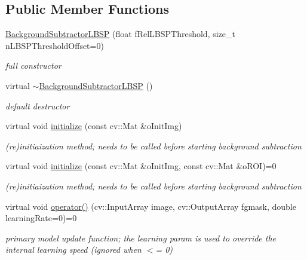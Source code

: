 \subsection*{Public Member Functions}
\begin{DoxyCompactItemize}
\item 
\mbox{\hyperlink{class_background_subtractor_l_b_s_p_a5f7f42ea5c9697479cbe237b49ca6ae9}{Background\+Subtractor\+L\+B\+SP}} (float f\+Rel\+L\+B\+S\+P\+Threshold, size\+\_\+t n\+L\+B\+S\+P\+Threshold\+Offset=0)
\begin{DoxyCompactList}\small\item\em full constructor \end{DoxyCompactList}\item 
virtual \mbox{\hyperlink{class_background_subtractor_l_b_s_p_a027bdf387b28e5532d78b5bf4e7c08eb}{$\sim$\+Background\+Subtractor\+L\+B\+SP}} ()
\begin{DoxyCompactList}\small\item\em default destructor \end{DoxyCompactList}\item 
virtual void \mbox{\hyperlink{class_background_subtractor_l_b_s_p_ac6b854f94414497b143375d4a0ae8b6f}{initialize}} (const cv\+::\+Mat \&o\+Init\+Img)
\begin{DoxyCompactList}\small\item\em (re)initiaization method; needs to be called before starting background subtraction \end{DoxyCompactList}\item 
virtual void \mbox{\hyperlink{class_background_subtractor_l_b_s_p_a3644bc10ec3beda6fad22c633fe0f8fb}{initialize}} (const cv\+::\+Mat \&o\+Init\+Img, const cv\+::\+Mat \&o\+R\+OI)=0
\begin{DoxyCompactList}\small\item\em (re)initiaization method; needs to be called before starting background subtraction \end{DoxyCompactList}\item 
virtual void \mbox{\hyperlink{class_background_subtractor_l_b_s_p_a4771cac59b7ac865d6ec25cbf049948e}{operator()}} (cv\+::\+Input\+Array image, cv\+::\+Output\+Array fgmask, double learning\+Rate=0)=0
\begin{DoxyCompactList}\small\item\em primary model update function; the learning param is used to override the internal learning speed (ignored when $<$= 0) \end{DoxyCompactList}\item 

\end{DoxyCompactItemize}
